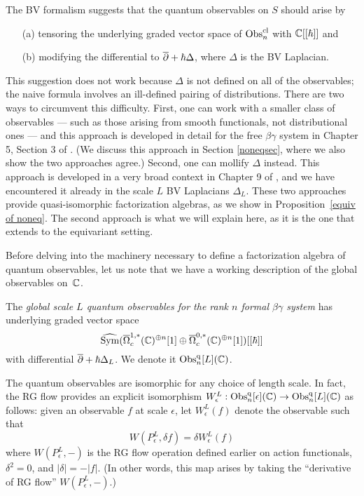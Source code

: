 The BV formalism suggests that the quantum observables on $S$ should arise by 
\begin{enumerate}
\item[(a)] tensoring the underlying graded vector space of ${\rm Obs}^{\rm cl}_n$ with $\mathbb C[[\hbar]]$ and
\item[(b)] modifying the differential to $\overline{\partial} +\hbar \Delta$, where $\Delta$ is the BV Laplacian.
\end{enumerate}
This suggestion does not work because $\Delta$ is not defined on all of the observables;
the naive formula involves an ill-defined pairing of distributions.
There are two ways to circumvent this difficulty. 
First, one can work with a smaller class of observables --- such as those arising from smooth functionals, not distributional ones --- and this approach is developed in detail for the free $\beta\gamma$ system in Chapter 5, Section 3 of \cite{CG1}.
(We discuss this approach in Section \ref{noneqsec}, where we also show the two approaches agree.) 
Second, one can mollify $\Delta$ instead.
This approach is developed in a very broad context in Chapter 9 of \cite{CG2},
and we have encountered it already in the scale $L$ BV Laplacians $\Delta_L$.
These two approaches provide quasi-isomorphic factorization algebras, 
as we show in Proposition~\ref{equiv of noneq}. The second approach is what we will explain here, as it is the one that extends to the equivariant setting.


Before delving into the machinery necessary to define a factorization algebra of quantum observables,
let us note that we have a working description of the global observables on~$\mathbb C$.

\begin{dfn}
The \emph{global scale $L$ quantum observables for the rank $n$ formal $\beta\gamma$ system} has
underlying graded vector space
\[
\widehat{{\rm Sym}}(\overline{\Omega}^{1,*}_c(\mathbb C)^{\oplus n}[1] \oplus \overline{\Omega}^{0,*}_c(\mathbb C)^{\oplus n}[1])[[\hbar]]
\]
with differential $\overline{\partial} + \hbar \Delta_L$. 
We denote it ${\rm Obs}^{\rm q}_n[L](\mathbb C)$.
\end{dfn}

The quantum observables are isomorphic for any choice of length scale.
In fact, the RG flow provides an explicit isomorphism $W_\epsilon^L: {\rm Obs}^{\rm q}_n[\epsilon](\mathbb C) \to {\rm Obs}^{\rm q}_n[L](\mathbb C)$ as follows: 
given an observable $f$ at scale $\epsilon$, let $W_\epsilon^L(f)$ denote the observable such that
\[
W(P_\epsilon^L, \delta f) = \delta W_\epsilon^L(f)
\]
where $W(P_\epsilon^L, -)$ is the RG flow operation defined earlier on action functionals, 
$\delta^2=0$,  and $|\delta| = - |f|$. 
(In other words, this map arises by taking the ``derivative of RG flow'' $W(P_\epsilon^L, -)$.)

